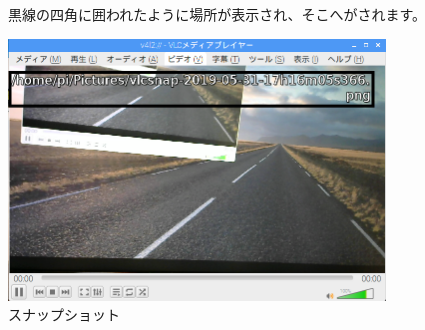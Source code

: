 \begin{figure}[ht]
  \flushleft
  黒線の四角に囲われたように場所が表示され、そこへがされます。

  \centering
  \begin{minipage}{10cm}
    \includegraphics[width=10cm]{text01-img/textbook-img120.png}
    \caption{スナップショット}
  \end{minipage}

\end{figure}
\clearpage

